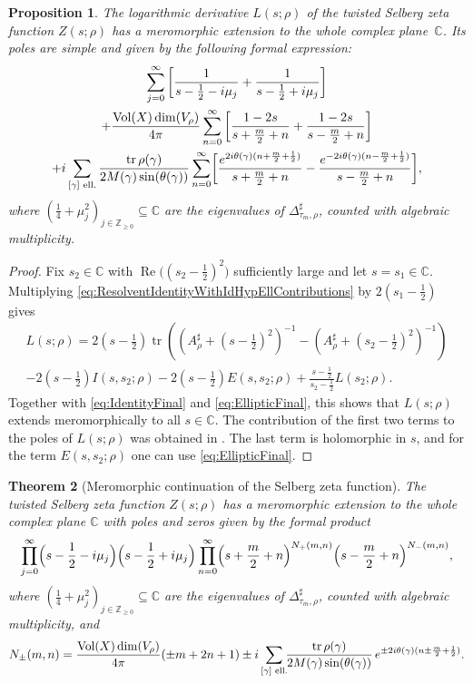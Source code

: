 \documentclass[10pt]{amsart}
\theoremstyle{plain}
\newtheorem{thm}{Theorem}[subsection]
\newtheorem{prop}[thm]{Proposition}
\theoremstyle{definition}
\theoremstyle{remark}
\newcommand{\Z}{\mathbb{Z}}
\newcommand{\C}{\mathbb{C}}
\DeclareMathOperator{\RE}{Re}
\DeclareMathOperator{\tr}{tr}
\DeclareMathOperator{\Vol}{Vol}
\numberwithin{equation}{section}
\begin{document}
\begin{prop}\label{prop:LMero}
The logarithmic derivative $L(s;\rho)$ of the twisted Selberg zeta function $Z(s;\rho)$ has a meromorphic extension to the whole complex plane~$\C$. Its poles are simple and given by the following formal expression:
\begin{multline*}
\sum_{j=0}^\infty\left[\frac{1}{s-\frac{1}{2}-i\mu_j}+\frac{1}{s-\frac{1}{2}+i\mu_j}\right]\\
+\frac{\Vol(X)\dim(V_\rho)}{4\pi}\sum_{n=0}^\infty\left[\frac{1-2s}{s+\frac{m}{2}+n}+\frac{1-2s}{s-\frac{m}{2}+n}\right]\\
+i\sum_{[\gamma]\textup{ ell.}}\frac{\tr\rho(\gamma)}{2M(\gamma)\sin(\theta(\gamma))}\sum_{n=0}^\infty\biggl[\frac{e^{2i\theta(\gamma)(n+\frac{m}{2}+\frac{1}{2})}}{s+\frac{m}{2}+n}-\frac{e^{-2i\theta(\gamma)(n-\frac{m}{2}+\frac{1}{2})}}{s-\frac{m}{2}+n}\biggr],
\end{multline*}
where $(\frac{1}{4}+\mu_j^2)_{j\in\Z_{\geq0}}\subseteq\C$ are the eigenvalues of $\Delta_{\tau_m,\rho}^\sharp$, counted with algebraic multiplicity.
\end{prop}

\begin{proof}
Fix $s_2\in\C$ with $\RE\big((s_2-\frac{1}{2})^2\big)$ sufficiently large and let $s=s_1\in\C$. Multiplying \cref{eq:ResolventIdentityWithIdHypEllContributions} by $2(s_1-\frac{1}{2})$ gives
\begin{multline*}
L(s;\rho) = 2(s-\tfrac{1}{2})\tr\left(\left(A_\rho^\sharp+(s-\tfrac{1}{2})^2\right)^{-1}-\left(A_\rho^\sharp+(s_2-\tfrac{1}{2})^2\right)^{-1}\right)\\
-2(s-\tfrac{1}{2})I(s,s_2;\rho)-2(s-\tfrac{1}{2})E(s,s_2;\rho)+\frac{s-\frac{1}{2}}{s_2-\frac{1}{2}}L(s_2;\rho).
\end{multline*}
Together with \cref{eq:IdentityFinal} and \cref{eq:EllipticFinal}, this shows that $L(s;\rho)$ extends meromorphically to all $s\in\C$. The contribution of the first two terms to the poles of $L(s;\rho)$ was obtained in \cite[Prop.\,4.2.5]{FS}. The last term is holomorphic in $s$, and for the term $E(s,s_2;\rho)$ one can use \cref{eq:EllipticFinal}.
\end{proof}

\begin{thm}[Meromorphic continuation of the Selberg zeta function]
\label{theo:mero}
The twisted Selberg zeta function $Z(s;\rho)$ has a meromorphic extension to the whole complex plane $\C$ with poles and zeros given by the formal product
\[
\prod_{j=0}^\infty\Bigl(s-\frac{1}{2}-i\mu_j\Bigr)\Bigl(s-\frac{1}{2}+i\mu_j\Bigr)\prod_{n=0}^\infty\Bigl(s+\frac{m}{2}+n\Bigr)^{N_+(m,n)}\Bigl(s-\frac{m}{2}+n\Bigr)^{N_-(m,n)},
\]
where $(\frac{1}{4}+\mu_j^2)_{j\in\Z_{\geq0}}\subseteq\C$ are the eigenvalues of $\Delta_{\tau_m,\rho}^\sharp$, counted with algebraic multiplicity, and
\[
N_\pm(m,n) = \frac{\Vol(X)\dim(V_\rho)}{4\pi}(\pm m+2n+1)\\
\pm i\sum_{[\gamma]\textup{ ell.}}\!\!\frac{\tr\rho(\gamma)}{2M(\gamma)\sin(\theta(\gamma))}\,e^{\pm2i\theta(\gamma)(n\pm\frac{m}{2}+\frac{1}{2})}.
\]
\end{thm}
\end{document}
